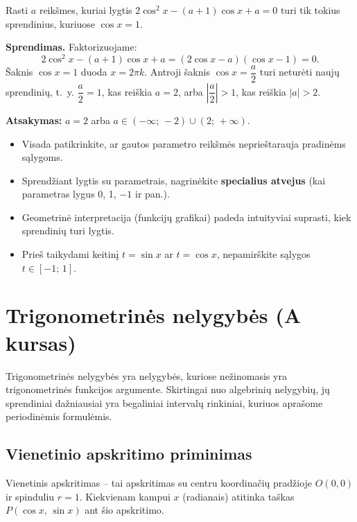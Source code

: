 \begin{exercise}
Rasti \(a\) reikšmes, kuriai lygtis \(2\cos^2 x - (a+1)\cos x + a = 0\) turi tik tokius sprendinius, kuriuose \(\cos x = 1\).

\textbf{Sprendimas.} Faktorizuojame:
\[
2\cos^2 x - (a+1)\cos x + a = (2\cos x - a)(\cos x - 1) = 0.
\]
Šaknis \(\cos x = 1\) duoda \(x = 2\pi k\). Antroji šaknis \(\cos x = \dfrac{a}{2}\) turi neturėti naujų sprendinių, t.~y. \(\dfrac{a}{2} = 1\), kas reiškia \(a = 2\), arba \(\left|\dfrac{a}{2}\right| > 1\), kas reiškia \(|a| > 2\).

\textbf{Atsakymas:} \(a = 2\) arba \(a \in (-\infty;\, -2) \cup (2;\, +\infty)\).
\end{exercise}

\begin{tcolorbox}[title={VBE patarimai}]
\begin{itemize}
    \item Visada patikrinkite, ar gautos parametro reikšmės neprieštarauja pradinėms sąlygoms.
    \item Sprendžiant lygtis su parametrais, nagrinėkite \textbf{specialius atvejus} (kai parametras lygus 0, 1, \(-1\) ir pan.).
    \item Geometrinė interpretacija (funkcijų grafikai) padeda intuityviai suprasti, kiek sprendinių turi lygtis.
    \item Prieš taikydami keitinį \(t = \sin x\) ar \(t = \cos x\), nepamirškite sąlygos \(t \in [-1;\, 1]\).
\end{itemize}
\end{tcolorbox}

\section{Trigonometrinės nelygybės (A kursas)}

Trigonometrinės nelygybės yra nelygybės, kuriose nežinomasis yra trigonometrinės funkcijos argumente. Skirtingai nuo algebrinių nelygybių, jų sprendiniai dažniausiai yra begaliniai intervalų rinkiniai, kuriuos aprašome periodinėmis formulėmis.

\subsection{Vienetinio apskritimo priminimas}

\begin{tcolorbox}[colback=blue!5!white, colframe=blue!60!black, title=Vienetinis apskritimas]
Vienetinis apskritimas -- tai apskritimas su centru koordinačių pradžioje $O(0,0)$ ir spinduliu $r = 1$. Kiekvienam kampui $x$ (radianais) atitinka taškas $P(\cos x,\, \sin x)$ ant šio apskritimo.
\end{tcolorbox}


